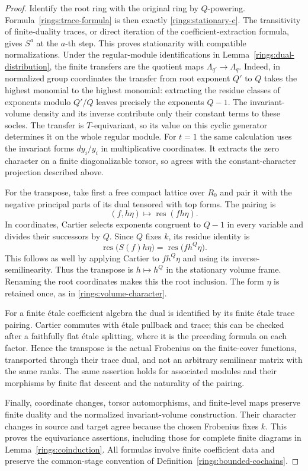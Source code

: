 \begin{proof}
Identify the root ring with the original ring by
$Q$-powering.  Formula~\eqref{rings:trace-formula}
is then exactly \eqref{rings:stationary-c}.  The
transitivity of finite-duality traces, or direct
iteration of the coefficient-extraction formula,
gives $S^a$ at the $a$-th step.  This proves
stationarity with compatible normalizations.
Under the regular-module identifications in
Lemma~\ref{rings:dual-distribution}, the finite
transfers are the quotient maps
$\Lambda_{q'}\to\Lambda_q$.  Indeed, in normalized
group coordinates the transfer from root exponent
$Q'$ to $Q$ takes the highest monomial to the
highest monomial: extracting the residue classes
of exponents modulo $Q'/Q$ leaves precisely
the exponents $Q-1$.  The invariant-volume
density and its inverse contribute only their
constant terms to these socles.  The transfer
is $T$-equivariant, so its value on this cyclic
generator determines it on the whole regular module.
For $t=1$ the same calculation uses the invariant
forms $dy_i/y_i$ in multiplicative coordinates.
It extracts the zero character on a finite
diagonalizable torsor, so agrees with the
constant-character projection described above.

For the transpose, take first a free compact lattice
over $R_0$ and pair it with the negative principal
parts of its dual tensored with top forms.  The
pairing is
\[
 (f,h\eta)\longmapsto
 \operatorname{res}(fh\eta).
\]
In coordinates, Cartier selects exponents congruent
to $Q-1$ in every variable and divides their
successors by $Q$.  Since $Q$ fixes $k$, its residue
identity is
\begin{equation}\label{rings:transpose-residue}
 \operatorname{res}\bigl(S(f)h\eta\bigr)
       =\operatorname{res}\bigl(fh^Q\eta\bigr).
\end{equation}
This follows as well by applying Cartier to
$fh^Q\eta$ and using its inverse-semilinearity.
Thus the transpose is $h\mapsto h^Q$ in the
stationary volume frame.  Renaming the root
coordinates makes this the root inclusion.  The
form $\eta$ is retained once, as in
\eqref{rings:volume-character}.

For a finite \'etale coefficient algebra the dual
is identified by its finite \'etale trace pairing.
Cartier commutes with \'etale pullback and trace;
this can be checked after a faithfully flat
\'etale splitting, where it is the preceding
formula on each factor.  Hence the transpose is
the actual Frobenius on the finite-cover functions,
transported through their trace dual, and not an
arbitrary semilinear matrix with the same ranks.
The same assertion holds for associated modules
and their morphisms by finite flat descent and
the naturality of the pairing.

Finally, coordinate changes, torsor automorphisms,
and finite-level maps preserve finite duality and
the normalized invariant-volume construction.
Their character changes in source and target agree
because the chosen Frobenius fixes $k$.  This
proves the equivariance assertions, including
those for complete finite diagrams in
Lemma~\ref{rings:coinduction}.  All formulas involve
finite coefficient data and preserve the common-stage
convention of Definition~\ref{rings:bounded-cochains}.
\end{proof}

